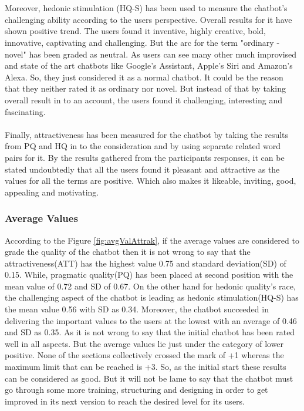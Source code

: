 \\~\\
Moreover, hedonic stimulation (HQ-S) has been used to measure the chatbot's challenging ability according to the users perspective. Overall results for it have shown positive trend. The users found it inventive, highly creative, bold, innovative, captivating and challenging. But the arc for the term "ordinary - novel" has been graded as neutral. As users can see many other much improvised and state of the art chatbots like Google's Assistant, Apple's Siri and Amazon's Alexa. So, they just considered it as a normal chatbot. It could be the reason that they neither rated it as ordinary nor novel. But instead of that by taking overall result in to an account, the users found it challenging, interesting and fascinating.
\\~\\
Finally, attractiveness has been measured for the chatbot by taking the results from PQ and HQ in to the consideration and by using separate related word pairs for it. By the results gathered from the participants responses, it can be stated undoubtedly that all the users found it pleasant and attractive as the values for all the terms are positive. Which also makes it likeable, inviting, good, appealing and motivating.

\subsubsection*{Average Values}
According to the Figure \ref{fig:avgValAttrak}, if the average values are considered to grade the quality of the chatbot then it is not wrong to say that the attractiveness(ATT) has the highest value 0.75 and standard deviation(SD) of 0.15. While, pragmatic quality(PQ) has been placed at second position with the mean value of 0.72 and SD of 0.67. On the other hand for hedonic quality's race, the challenging aspect of the chatbot is leading as hedonic stimulation(HQ-S) has the mean value 0.56 with SD as 0.34. Moreover, the chatbot succeeded in delivering the important values to the users at the lowest with an average of 0.46 and SD as 0.35. As it is not wrong to say that the initial chatbot has been rated well in all aspects. But the average values lie just under the category of lower positive. None of the sections collectively crossed the mark of +1 whereas the maximum limit that can be reached is +3. So, as the initial start these results can be considered as good. But it will not be lame to say that the chatbot must go through some more training, structuring and designing in order to get improved in its next version to reach the desired level for its users.

